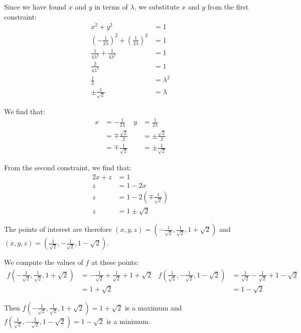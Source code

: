\begin{solution}
    Since we have found \(x\) and \(y\) in terms of \(\lambda\), we substitute \(x\) and \(y\) from the first constraint:
    \begin{align*}
        x^2 + y^2 &= 1 \\
        \left(-\frac{1}{2\lambda}\right)^2 + \left(\frac{1}{2\lambda}\right)^2 &= 1 \\
        \frac{1}{4\lambda^2} + \frac{1}{4\lambda^2} &= 1 \\
        \frac{2}{4\lambda^2} &= 1 \\
        \frac{1}{2} &= \lambda^2 \\
        \pm\frac{1}{\sqrt{2}} &= \lambda
    \end{align*}
    
    We find that:
    \begin{align*}
        x &= -\frac{1}{2\lambda} & y &= \frac{1}{2\lambda} \\
        &= \mp \frac{\sqrt{2}}{2} & &= \pm \frac{\sqrt{2}}{2} \\
        &= \mp \frac{1}{\sqrt{2}} & &= \pm \frac{1}{\sqrt{2}}
    \end{align*}
    
    From the second constraint, we find that:
    \begin{align*}
        2x + z &= 1 \\
        z &= 1 - 2x \\
        z &= 1 - 2\left(\mp \frac{1}{\sqrt{2}}\right) \\
        z &= 1 \pm \sqrt{2} 
    \end{align*}

    The points of interest are therefore \((x, y, z) = \left(-\frac{1}{\sqrt{2}}, \frac{1}{\sqrt{2}}, 1 + \sqrt{2}\right)\) and \((x, y, z) = \left(\frac{1}{\sqrt{2}}, -\frac{1}{\sqrt{2}}, 1 - \sqrt{2}\right)\).
    
    We compute the values of \(f\) at these points:
    \begin{align*}
        f\left(-\frac{1}{\sqrt{2}}, \frac{1}{\sqrt{2}}, 1 + \sqrt{2}\right) &= -\frac{1}{\sqrt{2}} + \frac{1}{\sqrt{2}} + 1 + \sqrt{2} & f\left(\frac{1}{\sqrt{2}}, -\frac{1}{\sqrt{2}}, 1 - \sqrt{2}\right) &= \frac{1}{\sqrt{2}} - \frac{1}{\sqrt{2}} + 1 - \sqrt{2} \\
        &= 1 + \sqrt{2} & &= 1 - \sqrt{2}
    \end{align*}
    
    Then \(f\left(-\frac{1}{\sqrt{2}}, \frac{1}{\sqrt{2}}, 1 + \sqrt{2}\right) = 1 + \sqrt{2}\) is a maximum and \(f\left(\frac{1}{\sqrt{2}}, -\frac{1}{\sqrt{2}}, 1 - \sqrt{2}\right) = 1 - \sqrt{2}\) is a minimum.
\end{solution}